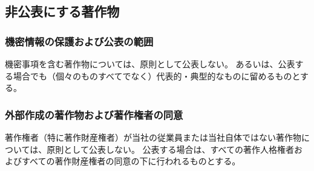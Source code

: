 \subsection{非公表にする著作物}

\subsubsection{機密情報の保護および公表の範囲\label{subsec:notopenwork}}
機密事項を含む著作物については、原則として公表しない。
あるいは、公表する場合でも（個々のものすべてでなく）代表的・典型的なものに留めるものとする。

\subsubsection{外部作成の著作物および著作権者の同意\label{subsec:copyrightsSubcontractor}}
著作権者（特に著作財産権者）が当社の従業員または当社自体ではない著作物については、原則として公表しない。
公表する場合は、すべての著作人格権者およびすべての著作財産権者の同意の下に行われるものとする。

